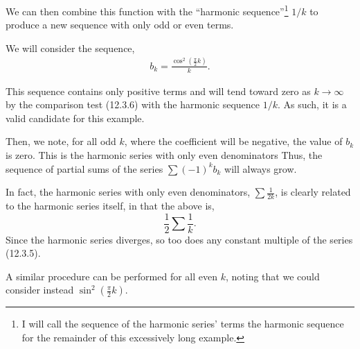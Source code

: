 \documentclass[../hw3]{subfiles}
\begin{document}
We can then combine this function with the ``harmonic sequence''\footnote{I will call the sequence of the harmonic series' terms the harmonic sequence for the remainder of this excessively long example.} $1/k$ to produce a new sequence with only odd or even terms.

We will consider the sequence,
\begin{align*}
    b_k=\frac{\cos^2{\left( \frac{\pi}{2}k \right)}}{k}.
\end{align*}

This sequence contains only positive terms and will tend toward zero as $k\to\infty$ by the comparison test (12.3.6) with the harmonic sequence $1/k$. As such, it is a valid candidate for this example.

Then, we note, for all odd $k$, where the coefficient will be negative, the value of $b_k$ is zero. This is the harmonic series with only even denominators Thus, the sequence of partial sums of the series $\sum {(-1)}^k b_k$ will always grow. 

In fact, the harmonic series with only even denominators, $\sum \frac{1}{2k}$, is clearly related to the harmonic series itself, in that the above is, \[\frac{1}{2} \sum \frac{1}{k}.\] Since the harmonic series diverges, so too does any constant multiple of the series (12.3.5). 

A similar procedure can be performed for all even $k$, noting that we could consider instead $\sin^2{\left( \frac{\pi}{2} k \right)}$.
\end{document}
